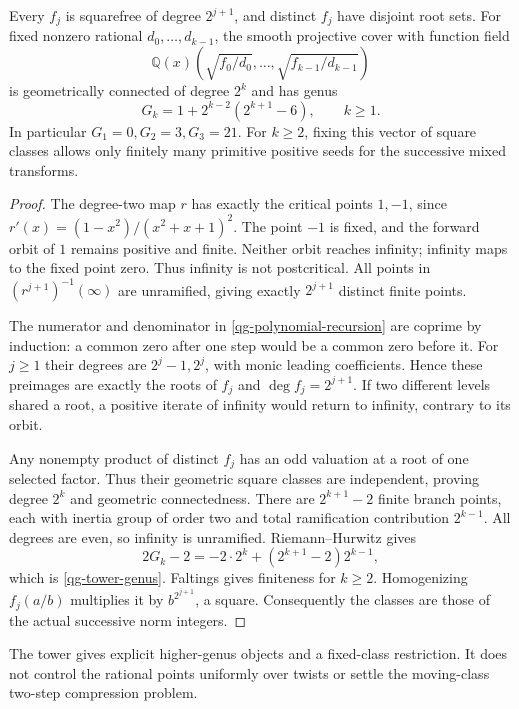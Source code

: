 \begin{theorem}\label{qg-dynamic-tower}
Every $f_j$ is squarefree of degree $2^{j+1}$, and distinct $f_j$ have
disjoint root sets. For fixed nonzero rational $d_0,\ldots,d_{k-1}$, the
smooth projective cover with function field
\[
 \mathbb Q(x)\left(\sqrt{f_0/d_0},\ldots,
                         \sqrt{f_{k-1}/d_{k-1}}\right)
\]
is geometrically connected of degree $2^k$ and has genus
\begin{equation}\label{qg-tower-genus}
 G_k=1+2^{k-2}(2^{k+1}-6),\qquad k\ge1.
\end{equation}
In particular $G_1=0,G_2=3,G_3=21$. For $k\ge2$, fixing this vector
of square classes allows only finitely many primitive positive seeds for
the successive mixed transforms.
\end{theorem}
\begin{proof}
The degree-two map $r$ has exactly the critical points $1,-1$, since
$r'(x)=(1-x^2)/(x^2+x+1)^2$. The point $-1$ is fixed, and the forward
orbit of $1$ remains positive and finite. Neither orbit reaches infinity;
infinity maps to the fixed point zero. Thus infinity is not postcritical.
All points in $(r^{j+1})^{-1}(\infty)$ are unramified, giving exactly
$2^{j+1}$ distinct finite points.

The numerator and denominator in \eqref{qg-polynomial-recursion} are
coprime by induction: a common zero after one step would be a common zero
before it. For $j\ge1$ their degrees are $2^j-1,2^j$, with monic leading
coefficients. Hence these preimages are exactly the roots of $f_j$ and
$\deg f_j=2^{j+1}$. If two different levels shared a root, a positive
iterate of infinity would return to infinity, contrary to its orbit.

Any nonempty product of distinct $f_j$ has an odd valuation at a root of
one selected factor. Thus their geometric square classes are independent,
proving degree $2^k$ and geometric connectedness. There are
$2^{k+1}-2$ finite branch points, each with inertia group of order two and
total ramification contribution $2^{k-1}$. All degrees are even, so
infinity is unramified. Riemann--Hurwitz gives
\[
 2G_k-2=-2\cdot2^k+(2^{k+1}-2)2^{k-1},
\]
which is \eqref{qg-tower-genus}. Faltings gives finiteness for $k\ge2$.
Homogenizing $f_j(a/b)$ multiplies it by $b^{2^{j+1}}$, a square.
Consequently the classes are those of the actual successive norm integers.
\end{proof}
The tower gives explicit higher-genus objects and a fixed-class restriction.
It does not control the rational points uniformly over twists or settle the
moving-class two-step compression problem.
